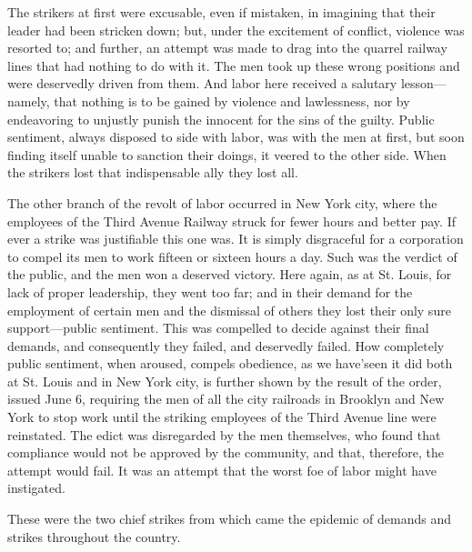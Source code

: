 \documentclass[11pt,openany]{book}
\begin{document}
The strikers at first were excusable, even if mistaken, in imagining that their leader had been stricken down; but, under the excitement of conflict, violence was resorted to; and further, an attempt was made to drag into the quarrel railway lines that had nothing to do with it. The men took up these wrong positions and were deservedly driven from them. And labor here received a salutary lesson---namely, that nothing is to be gained by violence and lawlessness, nor by endeavoring to unjustly punish the innocent for the sins of the guilty. Public sentiment, always disposed to side with labor, was with the men at first, but soon finding itself unable to sanction their doings, it veered to the other side. When the strikers lost that indispensable ally they lost all.

The other branch of the revolt of labor occurred in New York city, where the employees of the Third Avenue Railway struck for fewer hours and better pay. If ever a strike was justifiable this one was. It is simply disgraceful for a corporation to compel its men to work fifteen or sixteen hours a day. Such was the verdict of the public, and the men won a deserved victory. Here again, as at St. Louis, for lack of proper leadership, they went too far; and in their demand for the employment of certain men and the dismissal of others they lost their only sure support---public sentiment. This was compelled to decide against their final demands, and consequently they failed, and deservedly failed. How completely public sentiment, when aroused, compels obedience, as we have'seen it did both at St. Louis and in New York city, is further shown by the result of the order, issued June 6, requiring the men of all the city railroads in Brooklyn and New York to stop work until the striking employees of the Third Avenue line were reinstated. The edict was disregarded by the men themselves, who found that compliance would not be approved by the community, and that, therefore, the attempt would fail. It was an attempt that the worst foe of labor might have instigated.

These were the two chief strikes from which came the epidemic of demands and strikes throughout the country.
\end{document}
